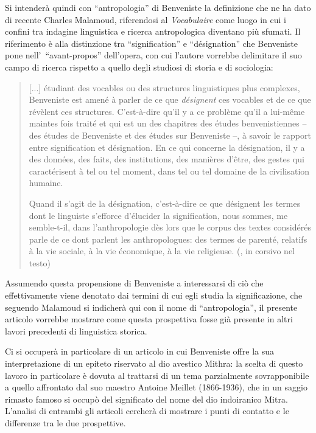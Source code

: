 \documentclass[output=paper]{langsci/langscibook}
\begin{document}
Si intenderà quindi con “antropologia” di Benveniste la definizione che ne ha dato di recente Charles Malamoud, riferendosi al \textit{Vocabulaire} come luogo in cui i confini tra indagine linguistica e ricerca antropologica diventano più sfumati. Il riferimento è alla distinzione tra “signification” e “désignation” che Benveniste pone nell’~“avant-propos” dell’opera, con cui l’autore vorrebbe delimitare il suo campo di ricerca rispetto a quello degli studiosi di storia e di sociologia:

\begin{quote}
    [...] étudiant des vocables ou des structures linguistiques plus complexes, Benveniste est amené à parler de ce que \textit{désignent} ces vocables et de ce que révèlent ces structures. C’est-à-dire qu’il y a ce problème qu’il a lui-même maintes fois traité et qui est un des chapitres des études benvenistiennes – des études de Benveniste et des études sur Benveniste –, à savoir le rapport entre signification et désignation.  En ce qui concerne la désignation, il y a des données, des faits, des institutions, des manières d’être, des gestes qui caractérisent à tel ou tel moment, dans tel ou tel domaine de la civilisation humaine. 

    Quand il s’agit de la désignation, c’est-à-dire ce que désignent les termes dont le linguiste s’efforce d’élucider la signification, nous sommes, me semble-t-il, dans l’anthropologie dès lors que le corpus des textes considérés parle de ce dont parlent les anthropologues: des termes de parenté, relatifs à la vie sociale, à la vie économique, à la vie religieuse. (\citealt[246]{fenoglio_lanthropologie_2016}, in corsivo nel testo)
\end{quote}

Assumendo questa propensione di Benveniste a interessarsi di ciò che effettivamente viene denotato dai termini di cui egli studia la significazione, che seguendo Malamoud si indicherà qui con il nome di “antropologia”, il presente articolo vorrebbe mostrare come questa prospettiva fosse già presente in altri lavori precedenti di linguistica storica. 

Ci si occuperà in particolare di un articolo in cui Benveniste offre la sua interpretazione di un epiteto riservato al dio avestico Mithra: la scelta di questo lavoro in particolare è dovuta al trattarsi di un tema parzialmente sovrapponibile a quello affrontato dal suo maestro Antoine Meillet (1866-1936), che in un saggio rimasto famoso si occupò del significato del nome del dio indoiranico Mitra. L’analisi di entrambi gli articoli cercherà di mostrare i punti di contatto e le differenze tra le due prospettive.
\end{document}
